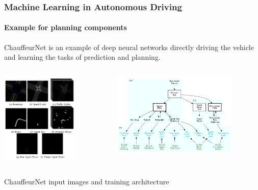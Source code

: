 {\begin{frame}
\frametitle{Machine Learning in Autonomous Driving}
\framesubtitle{Example for planning components}
ChauffeurNet is an example of deep neural networks directly driving the vehicle
and learning the tasks of prediction and planning.\\
\begin{columns}[T]
    \begin{column}{0.4\textwidth}
        \centering
        \includegraphics[width=0.7\textwidth]{images/waymo_chauffeurnet_inputs.png}\\
    \end{column}
    \begin{column}{0.6\textwidth}
        \centering
        \includegraphics[width=0.8\textwidth]{images/waymo_chauffeurnet_network.png}\\
    \end{column}
\end{columns}
\vspace{0.2cm}
\centering
\footnotesize{ChauffeurNet input images and training architecture \cite{Bansal2019}}
\end{frame}

} %


